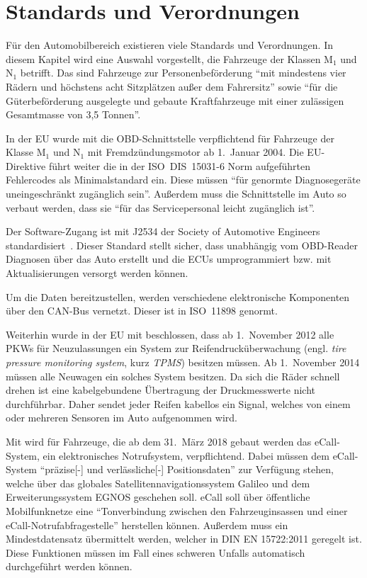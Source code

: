 \chapter{Standards und Verordnungen}\label{ch:standards}
Für den Automobilbereich existieren viele Standards und Verordnungen. In diesem
Kapitel wird eine Auswahl vorgestellt, die Fahrzeuge der Klassen M$_1$ und
N$_1$ betrifft. Das sind Fahrzeuge zur Personenbeförderung
\enquote{mit mindestens vier Rädern und höchstens acht Sitzplätzen außer dem Fahrersitz}
sowie \enquote{für die Güterbeförderung ausgelegte und gebaute Kraftfahrzeuge
mit einer zulässigen Gesamtmasse von 3,5 Tonnen}\cite{Richtlinie70/156/EWG:Fahrzeugklassen}.

In der EU wurde mit \cite{EUDirective98/69/EC} die OBD-Schnittstelle
verpflichtend für Fahrzeuge der Klasse M$_1$ und N$_1$ mit Fremdzündungsmotor
ab 1.~Januar 2004. Die EU-Direktive führt weiter die in der ISO~DIS~15031-6
Norm aufgeführten Fehlercodes als Minimalstandard ein. Diese müssen
\enquote{für genormte Diagnosegeräte \elide uneingeschränkt zugänglich sein}.
Außerdem muss die Schnittstelle im Auto so verbaut werden, dass sie
\enquote{für das Servicepersonal leicht zugänglich \elide ist}.

Der Software-Zugang ist mit J2534 der Society of Automotive Engineers
standardisiert~\cite{SAE2004}. Dieser Standard stellt sicher, dass unabhängig
vom OBD-Reader Diagnosen über das Auto erstellt und die ECUs umprogrammiert
bzw. mit Aktualisierungen versorgt werden können.

Um die Daten bereitzustellen, werden verschiedene elektronische Komponenten
über den CAN-Bus vernetzt. Dieser ist in ISO~11898 genormt.

Weiterhin wurde in der EU mit \cite{EURegulation661/2009} beschlossen, dass ab
1.~November 2012 alle PKWs für Neuzulassungen ein System zur
Reifendrucküberwachung (engl. \textit{tire pressure monitoring system}, kurz
\textit{TPMS}) besitzen müssen. Ab 1.~November 2014 müssen alle Neuwagen ein
solches System besitzen. Da sich die Räder schnell drehen ist eine
kabelgebundene Übertragung der Druckmesswerte nicht durchführbar. Daher sendet
jeder Reifen kabellos ein Signal, welches von einem oder mehreren Sensoren im
Auto aufgenommen wird.

Mit \cite{EURegulation2015/ecall} wird für Fahrzeuge, die ab dem 31.~März 2018
gebaut werden das eCall-System, ein elektronisches Notrufsystem, verpflichtend.
Dabei müssen dem eCall-System \enquote{präzise\mbox{[-]} und verlässliche\mbox{[-]}
Positionsdaten} zur Verfügung stehen, welche über das globales
Satellitennavigationssystem Galileo und dem Erweiterungssystem EGNOS geschehen
soll. eCall soll über öffentliche Mobilfunknetze eine \enquote{Tonverbindung
zwischen den Fahrzeuginsassen und einer eCall-Notrufabfragestelle} herstellen
können. Außerdem muss ein Mindestdatensatz übermittelt werden, welcher in
DIN EN 15722:2011 geregelt ist. Diese Funktionen müssen im Fall eines schweren
Unfalls automatisch durchgeführt werden können.